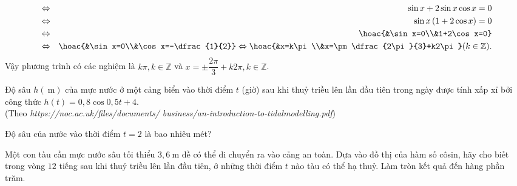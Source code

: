 \begin{bt}
{\begin{listEX}
\begin{eqnarray*}
				&\Leftrightarrow& \sin x+2\sin x\cos x=0 \\
				&\Leftrightarrow& \sin x \left(1+2\cos x\right)=0 \\
				&\Leftrightarrow& \hoac{&\sin x=0\\&1+2\cos x=0} \\
				&\Leftrightarrow& \hoac{&\sin x=0\\&\cos x=-\dfrac{1}{2}}\Leftrightarrow \hoac{&x=k\pi\\&x=\pm \dfrac{2\pi}{3}+k2\pi} (k\in\mathbb{Z}).
			\end{eqnarray*}	
			Vậy phương trình có các nghiệm là $k\pi, k\in\mathbb{Z}$ và $x=\pm \dfrac{2\pi}{3}+k2\pi, k\in\mathbb{Z}$.
		\end{listEX}
	}
\end{bt}

\begin{bt}%
	Độ sâu $h(\mathrm{~m})$ của mực nước ở một cảng biển vào thời điểm $t$ (giờ) sau khi thuỷ triều lên lần đầu tiên trong ngày được tính xấp xỉ bởi công thức $h(t)=0{,}8 \cos 0{,}5 t+4$.\\
	\mbox{}\hfill (Theo \textit{https://noc.ac.uk/files/documents/ business/an-introduction-to-tidalmodelling.pdf})
	\begin{listEX}
		\item Độ sâu của nước vào thời điểm $t=2$ là bao nhiêu mét?
		\item Một con tàu cần mực nước sâu tối thiểu $3{,}6 \mathrm{~m}$ đề có thể di chuyển ra vào cảng an toàn. Dựa vào đồ thị của hàm số côsin, hãy cho biết trong vòng $12$ tiếng sau khi thuỷ triều lên lần đầu tiên, ở những thời điểm $t$ nào tàu có thể hạ thuỷ. Làm tròn kết quả đến hàng phần trăm.
	\end{listEX}
\end{bt}
